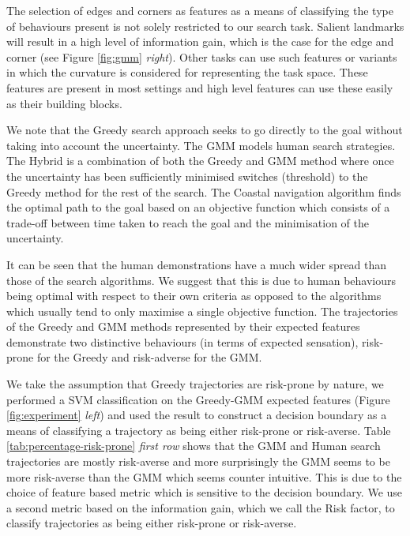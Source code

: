 The selection of edges and corners as features as a means of classifying the type of behaviours present 
is not solely restricted to our search task. Salient landmarks will result in a high level of information
gain, which is the case for the edge and corner (see Figure \ref{fig:gmm} \textit{right}).
Other tasks can use such features or variants in which the curvature is considered for representing the task space. 
These features are present in most settings and high level features can use these easily as their building blocks.


We note that the Greedy search approach seeks to go directly to the goal without taking into account 
the uncertainty. The GMM models human search strategies. The Hybrid is a combination of both the Greedy and GMM method 
where once the uncertainty has been sufficiently minimised switches (threshold) to the Greedy method for the rest of 
the search. The Coastal navigation algorithm finds the optimal path to the goal based on an objective function which
consists of a trade-off between time taken to reach the goal and the minimisation of the uncertainty.

It can be seen that the human demonstrations have a much wider spread than those of the search algorithms. 
We suggest that this is due to human behaviours being optimal with respect to their own criteria as opposed to the algorithms 
which usually tend to only maximise a single objective function. The trajectories of the Greedy and GMM methods represented by their 
expected features demonstrate two distinctive behaviours (in terms of expected sensation), risk-prone for the Greedy and risk-adverse
for the GMM.

We take the assumption that Greedy trajectories are risk-prone by nature, we performed a SVM classification on the 
Greedy-GMM expected features (Figure \ref{fig:experiment} \textit{left}) and used the result to construct a decision boundary as a means
of classifying a trajectory as being either risk-prone or risk-averse. Table \ref{tab:percentage-risk-prone} \textit{first row} shows that
the GMM and Human search trajectories are mostly risk-averse and more surprisingly the GMM seems to be more risk-averse than
the GMM which seems counter intuitive. This is due to the choice of feature based metric which is sensitive to the decision boundary. 
We use a second metric based on the information gain, which we call the Risk factor, to classify trajectories as being either risk-prone or risk-averse.

